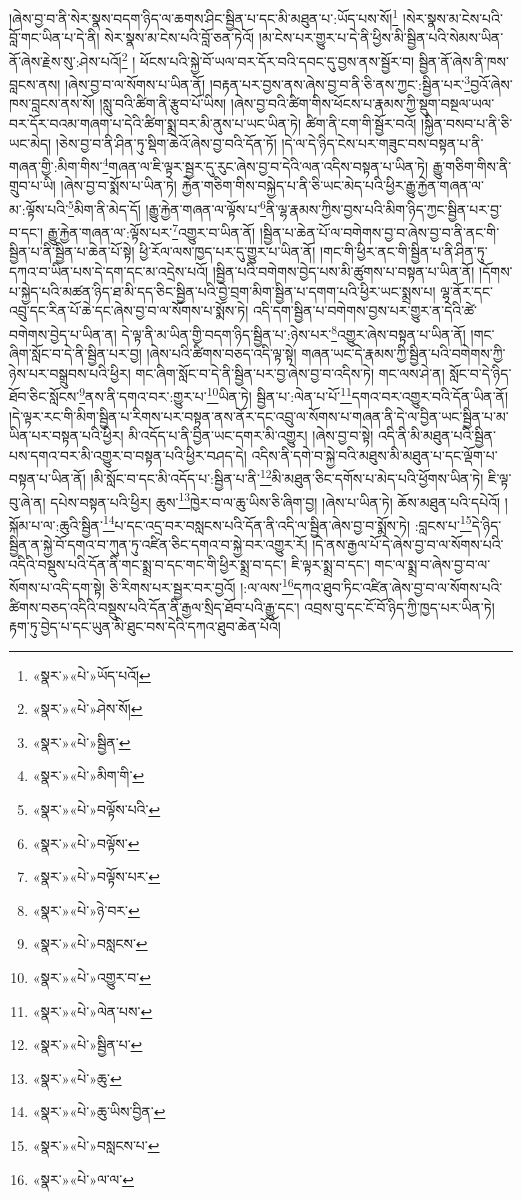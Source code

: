 །ཞེས་བྱ་བ་ནི་སེར་སྣས་བདག་ཉིད་ལ་ཆགས་ཤིང་སྦྱིན་པ་དང་མི་མཐུན་པ་:ཡོད་པས་སོ།\footnote{«སྣར་»«པེ་»ཡོད་པའོ།} །སེར་སྣས་མ་ངེས་པའི་བློ་གང་ཡིན་པ་དེ་ནི། སེར་སྣས་མ་ངེས་པའི་བློ་ཅན་ཏེའོ། །མ་ངེས་པར་གྱུར་པ་དེ་ནི་ཕྱིས་མི་སྦྱིན་པའི་སེམས་ཡིན་ནོ་ཞེས་རྗེས་སུ་:ཤེས་པའོ།\footnote{«སྣར་»«པེ་»ཤེས་སོ།} །
ཕོངས་པའི་སྐྱེ་བོ་ཡལ་བར་དོར་བའི་དབང་དུ་བྱས་ནས་སྦྱོར་བ། སྦྱིན་ནོ་ཞེས་ནི་ཁས་བླངས་ནས། །ཞེས་བྱ་བ་ལ་སོགས་པ་ཡིན་ནོ། །བརྟན་པར་བྱས་ནས་ཞེས་བྱ་བ་ནི་ཅི་ནས་ཀྱང་:སྦྱིན་པར་\footnote{«སྣར་»«པེ་»སྦྱིན་}བྱའོ་ཞེས་ཁས་བླངས་ནས་སོ། །སླུ་བའི་ཚིག་ནི་རྩུབ་པོ་ཡིས། །ཞེས་བྱ་བའི་ཚིག་གིས་ཕོངས་པ་རྣམས་ཀྱི་སྡུག་བསྔལ་ཡལ་བར་དོར་བའམ་གཞག་པ་དེའི་ཚིག་སྨྲ་བར་མི་ནུས་པ་ཡང་ཡིན་ཏེ། ཚིག་ནི་ངག་གི་སྦྱོར་བའོ། །སྐྱིན་བསབ་པ་ནི་ཅི་ཡང་མེད། །ཅེས་བྱ་བ་ནི་ཤིན་ཏུ་སྡིག་ཆེའོ་ཞེས་བྱ་བའི་དོན་ཏོ། །དེ་ལ་དེ་ཉིད་ངེས་པར་གཟུང་བས་བསྟན་པ་ནི་གཞན་གྱི་:མིག་གིས་\footnote{«སྣར་»«པེ་»མིག་གི་}གཞན་ལ་ཇི་ལྟར་སྦྱར་དུ་རུང་ཞེས་བྱ་བ་དེའི་ལན་འདིས་བསྟན་པ་ཡིན་ཏེ། རྒྱུ་གཅིག་གིས་ནི་གྲུབ་པ་ཡི། །ཞེས་བྱ་བ་སྨོས་པ་ཡིན་ཏེ། རྐྱེན་གཅིག་གིས་བསྐྱེད་པ་ནི་ཅི་ཡང་མེད་པའི་ཕྱིར་རྒྱུ་རྐྱེན་གཞན་ལ་མ་:ལྟོས་པའི་\footnote{«སྣར་»«པེ་»བལྟོས་པའི་}མིག་ནི་མེད་དོ། །རྒྱུ་རྐྱེན་གཞན་ལ་ལྟོས་པ་\footnote{«སྣར་»«པེ་»བལྟོས་}ནི་ལྷ་རྣམས་ཀྱིས་བྱས་པའི་མིག་ཉིད་ཀྱང་སྦྱིན་པར་བྱ་བ་དང་། རྒྱུ་རྐྱེན་གཞན་ལ་:ལྟོས་པར་\footnote{«སྣར་»«པེ་»བལྟོས་པར་}འགྱུར་བ་ཡིན་ནོ། །སྦྱིན་པ་ཆེན་པོ་ལ་བགེགས་བྱ་བ་ཞེས་བྱ་བ་ནི་ནང་གི་སྦྱིན་པ་ནི་སྦྱིན་པ་ཆེན་པོ་སྟེ། ཕྱི་རོལ་ལས་ཁྱད་པར་དུ་གྱུར་པ་ཡིན་ནོ། །གང་གི་ཕྱིར་ནང་གི་སྦྱིན་པ་ནི་ཤིན་ཏུ་དཀའ་བ་ཡིན་པས་དེ་དག་དང་མ་འདྲེས་པའོ། །སྦྱིན་པའི་བགེགས་བྱེད་པས་མི་ཚུགས་པ་བསྟན་པ་ཡིན་ནོ། །དོགས་པ་སྐྱེད་པའི་མཚན་ཉིད་ཐ་མི་དད་ཅིང་སྦྱིན་པའི་བྱེ་བྲག་མིག་སྦྱིན་པ་དགག་པའི་ཕྱིར་ཡང་སྨྲས་པ། ལྷ་ནོར་དང་འབྲུ་དང་རིན་པོ་ཆེ་དང་ཞེས་བྱ་བ་ལ་སོགས་པ་སྨོས་ཏེ། འདི་དག་སྦྱིན་པ་བགེགས་བྱས་པར་གྱུར་ན་དེའི་ཚེ་བགེགས་བྱེད་པ་ཡིན་ན། དེ་ལྟ་ནི་མ་ཡིན་གྱི་བདག་ཉིད་སྦྱིན་པ་:ཉེས་པར་\footnote{«སྣར་»«པེ་»ཉེ་བར་}འགྱུར་ཞེས་བསྟན་པ་ཡིན་ནོ། །གང་ཞིག་སློང་བ་དེ་ནི་སྦྱིན་པར་བྱ། །ཞེས་པའི་ཚིགས་བཅད་འདི་ལྟ་སྟེ། གཞན་ཡང་དེ་རྣམས་ཀྱི་སྦྱིན་པའི་བགེགས་ཀྱི་ཉེས་པར་བསྒྲུབས་པའི་ཕྱིར། གང་ཞིག་སློང་བ་དེ་ནི་སྦྱིན་པར་བྱ་ཞེས་བྱ་བ་འདིས་ཏེ། གང་ལས་ཤེ་ན། སློང་བ་དེ་ཉིད་ཐོབ་ཅིང་སློངས་\footnote{«སྣར་»«པེ་»བསླངས་}ནས་ནི་དགའ་བར་:གྱུར་པ་\footnote{«སྣར་»«པེ་»འགྱུར་བ་}ཡིན་ཏེ། སྦྱིན་པ་:ལེན་པ་པོ་\footnote{«སྣར་»«པེ་»ལེན་པས་}དགའ་བར་འགྱུར་བའི་དོན་ཡིན་ནོ། །དེ་ལྟར་རང་གི་མིག་སྦྱིན་པ་རིགས་པར་བསྟན་ནས་ནོར་དང་འབྲུ་ལ་སོགས་པ་གཞན་ནི་དེ་ལ་བྱིན་ཡང་སྦྱིན་པ་མ་ཡིན་པར་བསྟན་པའི་ཕྱིར། མི་འདོད་པ་ནི་བྱིན་ཡང་དགར་མི་འགྱུར། །ཞེས་བྱ་བ་སྟེ། འདི་ནི་མི་མཐུན་པའི་སྦྱིན་པས་དགའ་བར་མི་འགྱུར་བ་བསྟན་པའི་ཕྱིར་བཤད་དེ། འདིས་ནི་དགེ་བ་སྐྱེ་བའི་མཐུས་མི་མཐུན་པ་དང་ལྡོག་པ་བསྟན་པ་ཡིན་ནོ། །མི་སློང་བ་དང་མི་འདོད་པ་:སྦྱིན་པ་ནི་\footnote{«སྣར་»«པེ་»སྦྱིན་པ་}མི་མཐུན་ཅིང་དགོས་པ་མེད་པའི་ཕྱོགས་ཡིན་ཏེ། ཇི་ལྟ་བུ་ཞེ་ན། དཔེས་བསྟན་པའི་ཕྱིར། ཆུས་\footnote{«སྣར་»«པེ་»ཆུ་}ཁྱེར་བ་ལ་ཆུ་ཡིས་ཅི་ཞིག་བྱ། །ཞེས་པ་ཡིན་ཏེ། ཆོས་མཐུན་པའི་དཔེའོ། །སྐོམ་པ་ལ་:ཆུའི་སྦྱིན་\footnote{«སྣར་»«པེ་»ཆུ་ཡིས་བྱིན་}པ་དང་འདྲ་བར་བསླངས་པའི་དོན་ནི་འདི་ལ་སྦྱིན་ཞེས་བྱ་བ་སྨོས་ཏེ། :བླངས་པ་\footnote{«སྣར་»«པེ་»བསླངས་པ་}དེ་ཉིད་སྦྱིན་ན་སྐྱེ་བོ་དགའ་བ་ཀུན་ཏུ་འཛིན་ཅིང་དགའ་བ་སྐྱེ་བར་འགྱུར་རོ། །དེ་ནས་རྒྱལ་པོ་དེ་ཞེས་བྱ་བ་ལ་སོགས་པའི་འདིའི་བསྡུས་པའི་དོན་ནི་གང་སྨྲ་བ་དང་གང་གི་ཕྱིར་སྨྲ་བ་དང་། ཇི་ལྟར་སྨྲ་བ་དང་། གང་ལ་སྨྲ་བ་ཞེས་བྱ་བ་ལ་སོགས་པ་འདི་དག་སྟེ། ཅི་རིགས་པར་སྦྱར་བར་བྱའོ། །:ལ་ལས་\footnote{«སྣར་»«པེ་»ལ་ལ་}དཀའ་ཐུབ་ཏིང་འཛིན་ཞེས་བྱ་བ་ལ་སོགས་པའི་ཚིགས་བཅད་འདིའི་བསྡུས་པའི་དོན་ནི་རྒྱལ་སྲིད་ཐོབ་པའི་རྒྱུ་དང་། འབྲས་བུ་དང་ངོ་བོ་ཉིད་ཀྱི་ཁྱད་པར་ཡིན་ཏེ། རྟག་ཏུ་བྱེད་པ་དང་ཡུན་མི་ཐུང་བས་དེའི་དཀའ་ཐུབ་ཆེན་པོའོ། 